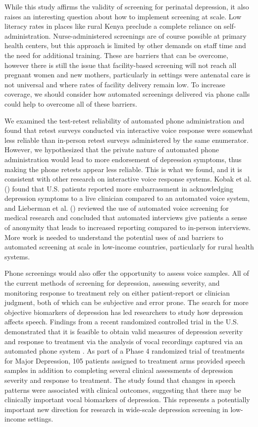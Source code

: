 \documentclass[man,natbib,longtable]{apa6}\usepackage[]{graphicx}\usepackage[]{color}
\begin{document}
While this study affirms the validity of screening for perinatal depression, it also raises an interesting question about how to implement screening at scale. Low literacy rates in places like rural Kenya preclude a complete reliance on self-administration. Nurse-administered screenings are of course possible at primary health centers, but this approach is limited by other demands on staff time and the need for additional training. These are barriers that can be overcome, however there is still the issue that facility-based screening will not reach all pregnant women and new mothers, particularly in settings were antenatal care is not universal and where rates of facility delivery remain low. To increase coverage, we should consider how automated screenings delivered via phone calls could help to overcome all of these barriers.

We examined the test-retest reliability of automated phone administration and found that retest surveys conducted via interactive voice response were somewhat less reliable than in-person retest surveys administered by the same enumerator. However, we hypothesized that the private nature of automated phone administration would lead to more endorsement of depression symptoms, thus making the phone retests appear less reliable. This is what we found, and it is consistent with other research on interactive voice response systems. Kobak et al. (\citeyear{Kobak:1999}) found that U.S. patients reported more embarrassment in acknowledging depression symptoms to a live clinician compared to an automated voice system, and Lieberman et al. (\citeyear{ Lieberman:2012}) reviewed the use of automated voice screening for medical research and concluded that automated interviews give patients a sense of anonymity that leads to increased reporting compared to in-person interviews. More work is needed to understand the potential uses of and barriers to automated screening at scale in low-income countries, particularly for rural health systems.

Phone screenings would also offer the opportunity to assess voice samples. All of the current methods of screening for depression, assessing severity, and monitoring response to treatment rely on either patient-report or clinician judgment, both of which can be subjective and error prone. The search for more objective biomarkers of depression has led researchers to study how depression affects speech. Findings from a recent randomized controlled trial in the U.S. demonstrated that it is feasible to obtain valid measures of depression severity and response to treatment via the analysis of vocal recordings captured via an automated phone system \citep{Mundt:2012}. As part of a Phase 4 randomized trial of treatments for Major Depression, 105 patients assigned to treatment arms provided speech samples in addition to completing several clinical assessments of depression severity and response to treatment. The study found that changes in speech patterns were associated with clinical outcomes, suggesting that there may be clinically important vocal biomarkers of depression. This represents a potentially important new direction for research in wide-scale depression screening in low-income settings.
\end{document}
